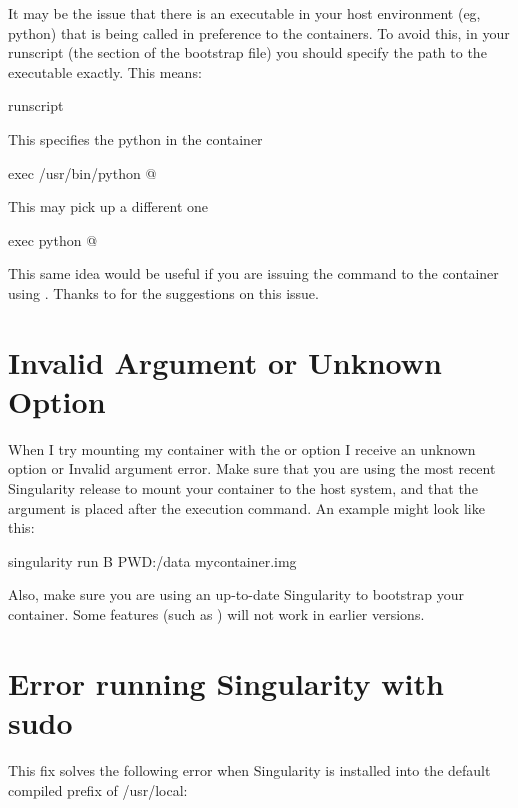 \documentclass[letterpaper,10pt,english]{sphinxmanual}
\begin{document}
It may be the issue that there is an executable in your host
environment (eg, python) that is being called in preference to the
containers. To avoid this, in your runscript (the  section of the
bootstrap file) you should specify the path to the executable exactly.
This means:

%
\begin{sphinxVerbatim}[commandchars=\\\{\}]
\PYGZpc{}runscript


\PYGZsh{} This specifies the python in the container

exec /usr/bin/python \PYGZdq{}\PYGZdl{}@\PYGZdq{}


\PYGZsh{} This may pick up a different one

exec python \PYGZdq{}\PYGZdl{}@\PYGZdq{}
\end{sphinxVerbatim}

This same idea would be useful if you are issuing the command to the
container using . Thanks to  for the suggestions on this
issue.


\section{Invalid Argument or Unknown Option}
\label{\detokenize{troubleshooting:invalid-argument-or-unknown-option}}
When I try mounting my container with the  or  option I receive an
unknown option or Invalid argument error.
Make sure that you are using the most recent Singularity release to
mount your container to the host system, and that the  argument is
placed after the execution command. An example might look like this:

%
\begin{sphinxVerbatim}[commandchars=\\\{\}]
\PYGZdl{} singularity run \PYGZhy{}B \PYGZdl{}PWD:/data my\PYGZus{}container.img
\end{sphinxVerbatim}

Also, make sure you are using an up-to-date Singularity to bootstrap
your container. Some features (such as  ) will not work in earlier
versions.


\section{Error running Singularity with sudo}
\label{\detokenize{troubleshooting:error-running-singularity-with-sudo}}
This fix solves the following error when Singularity is installed into
the default compiled prefix of /usr/local:
\end{document}
